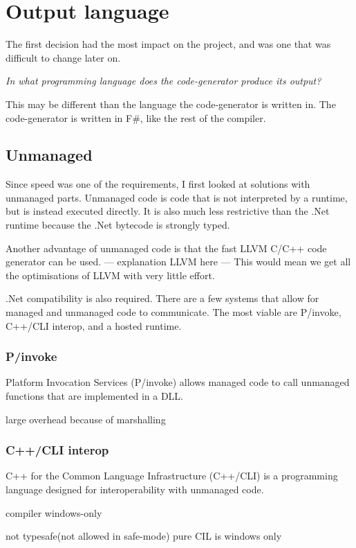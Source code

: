 \section{Output language}
The first decision had the most impact on the project, and was one that was difficult to change later on.

\textit{In what programming language does the code-generator produce its output?}

This may be different than the language the code-generator is written in.
The code-generator is written in F\#, like the rest of the compiler.


\subsection{Unmanaged}
Since speed was one of the requirements, I first looked at solutions with unmanaged parts.
Unmanaged code is code that is not interpreted by a runtime, but is instead executed directly.
It is also much less restrictive than the .Net runtime because the .Net bytecode is strongly typed.\cite{ecma335}

Another advantage of unmanaged code is that the fast LLVM C/C++ code generator can be used.
--- explanation LLVM here ---
This would mean we get all the optimisations of LLVM with very little effort.

.Net compatibility is also required.
There are a few systems that allow for managed and unmanaged code to communicate.
The most viable are P/invoke, C++/CLI interop, and a hosted runtime.

\subsubsection*{P/invoke}
Platform Invocation Services (P/invoke) allows managed code to call unmanaged functions that are implemented in a DLL.\cite{msdn_pinvoke}

large overhead because of marshalling \cite{msdn_interop_performance}

\subsubsection*{C++/CLI interop}
C++ for the Common Language Infrastructure (C++/CLI) is a programming language designed for interoperability with unmanaged code.%

compiler windows-only\cite{mono_c++cli}

not typesafe(not allowed in safe-mode) pure CIL is windows only\cite{mono_c++cli}

